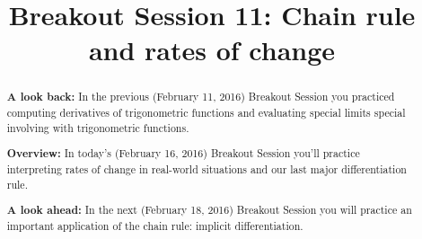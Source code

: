 \documentclass[handout,nooutcomes]{ximera}
\title{Breakout Session 11: Chain rule and rates of change}
\begin{document}
\begin{abstract}
  \textbf{A look back:} In the previous (February 11, 2016) Breakout Session you practiced computing derivatives of trigonometric functions and evaluating special limits special involving with trigonometric functions.

  \textbf{Overview:} In today's (February 16, 2016) Breakout Session you'll practice interpreting rates of change in real-world situations and our last major differentiation rule.

  \textbf{A look ahead:} In the next (February 18, 2016) Breakout Session you will practice an important application of the chain rule: implicit differentiation.
\end{abstract}
\maketitle
\end{document}
